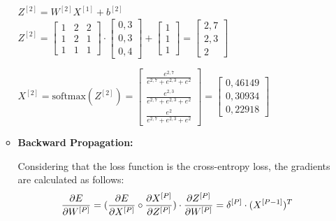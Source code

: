 \documentclass[12pt]{article}
\begin{document}
\begin{enumerate}[leftmargin=\labelsep, label=\textbf{\arabic*.)}]
\begin{itemize}
\begin{center}
                        $Z^{[2]}= W^{[2]}X^{[1]} + b^{[2]}$  \hspace{2em}
                        $Z^{[2]}= \begin{bmatrix}
                                1 & 2 & 2 \\
                                1 & 2 & 1 \\
                                1 & 1 & 1
                            \end{bmatrix} \cdot \begin{bmatrix}
                                0,3 \\
                                0,3 \\
                                0,4
                            \end{bmatrix} + \begin{bmatrix}
                                1 \\
                                1 \\
                                1
                            \end{bmatrix} = \begin{bmatrix}
                                2,7 \\
                                2,3 \\
                                2
                            \end{bmatrix}$
                        \vspace{0.5em}

                        $X^{[2]} = \text{softmax}(Z^{[2]}) = \begin{bmatrix}
                                \frac{e^{2,7}}{e^{2,7} + e^{2,3} + e^2} \\
                                \frac{e^{2,3}}{e^{2,7} + e^{2,3} + e^2} \\
                                \frac{e^2}{e^{2,7} + e^{2,3} + e^2}
                            \end{bmatrix} = \begin{bmatrix}
                                0,46149 \\
                                0,30934 \\
                                0,22918
                            \end{bmatrix}$
                        \vspace{0.25cm}
                    \end{center}
              \item \textbf{Backward Propagation:}
                    \begin{center}
                        \vspace{0.25cm}
                        Considering that the loss function is the cross-entropy loss, the gradients are calculated as follows:
                        $$\pdv{E}{W^{[P]}} = (\pdv{E}{X^{[P]}} \circ \pdv{X^{[P]}}{Z^{[P]}}) \cdot \pdv{Z^{[P]}}{W^{[P]}} = \delta^{[P]} \cdot (X^{[P-1]})^{T}$$


\end{center}
\end{itemize}
\end{enumerate}
\end{document}
